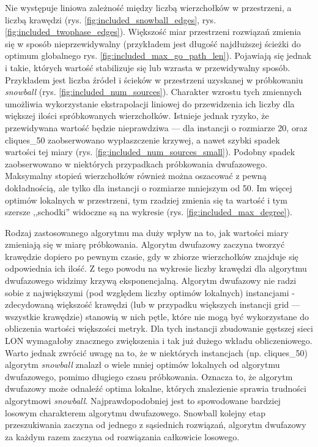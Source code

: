 Nie występuje liniowa zależność między liczbą wierzchołków w przestrzeni, a liczbą krawędzi (rys. \ref{fig:included_snowball_edges}, rys. \ref{fig:included_twophase_edges}).
Większość miar przestrzeni rozwiązań zmienia się w sposób nieprzewidywalny (przykładem jest długość najdłuższej ścieżki do optimum globalnego rys. \ref{fig:included_max_go_path_len}).
Pojawiają się jednak i takie, których wartość stabilizuje się lub wzrasta w przewidywalny sposób.
Przykładem jest liczba źródeł i ścieków w przestrzeni uzyskanej w próbkowaniu \textit{snowball} (rys. \ref{fig:included_num_sources}).
Charakter wzrostu tych zmiennych umożliwia wykorzystanie ekstrapolacji liniowej do przewidzenia ich liczby
dla większej ilości spróbkowanych wierzchołków.
Istnieje jednak ryzyko, że przewidywana wartość będzie nieprawdziwa --- dla instancji o rozmiarze 20, oraz cliques\_50
zaobserwowano wypłaszczenie krzywej, a nawet szybki spadek wartości tej miary (rys. \ref{fig:included_num_sources_small}).
Podobny spadek zaobserwowano w niektórych przypadkach próbkowania dwufazowego.
Maksymalny stopień wierzchołków również można oszacować z pewną dokładnością, ale tylko dla instancji o rozmiarze mniejszym od 50.
Im więcej optimów lokalnych w przestrzeni, tym rzadziej zmienia się ta wartość i tym szersze ,,schodki'' widoczne są na wykresie (rys. \ref{fig:included_max_degree}).

Rodzaj zastosowanego algorytmu ma duży wpływ na to, jak wartości miary zmieniają się w miarę próbkowania.
Algorytm dwufazowy zaczyna tworzyć krawędzie dopiero po pewnym czasie, gdy w zbiorze wierzchołków znajduje się
odpowiednia ich ilość. Z tego powodu na wykresie liczby krawędzi dla algorytmu dwufazowego widzimy krzywą eksponencjalną.
Algorytm dwufazowy nie radzi sobie z największymi (pod względem liczby optimów lokalnych) instancjami
- zdecydowaną większość krawędzi (lub w przypadku większych instancji grid --- wszystkie krawędzie) stanowią w nich pętle,
które nie mogą być wykorzystane do obliczenia wartości większości metryk.
Dla tych instancji zbudowanie gęstszej sieci LON wymagałoby znacznego zwiększenia i tak już dużego wkładu obliczeniowego.
Warto jednak zwrócić uwagę na to, że w niektórych instancjach (np. cliques\_50) algorytm \textit{snowball} znalazł o wiele mniej
optimów lokalnych od algorytmu dwufazowego, pomimo długiego czasu próbkowania.
Oznacza to, że algorytm dwufazowy może odnaleźć optima lokalne, których znalezienie sprawia trudności algorytmowi \textit{snowball}.
Najprawdopodobniej jest to spowodowane bardziej losowym charakterem algorytmu dwufazowego.
Snowball kolejny etap przeszukiwania zaczyna od jednego z sąsiednich rozwiązań, algorytm dwufazowy
za każdym razem zaczyna od rozwiązania całkowicie losowego.

